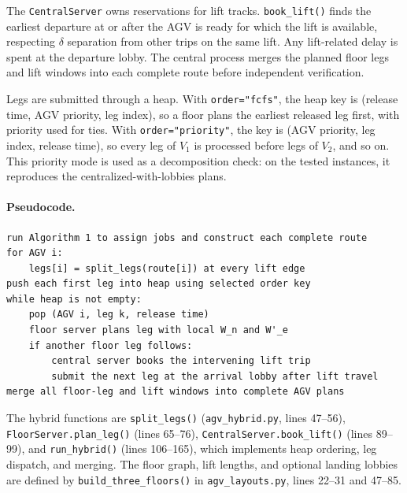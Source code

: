 \documentclass[11pt]{article}
\begin{document}
The \texttt{CentralServer} owns reservations for lift tracks.
\texttt{book\_lift()} finds the earliest departure at or after the AGV is
ready for which the lift is available, respecting $\delta$ separation from
other trips on the same lift. Any lift-related delay is spent at the
departure lobby. The central process merges the planned floor legs and lift
windows into each complete route before independent verification.

Legs are submitted through a heap. With \texttt{order="fcfs"}, the heap key is
(release time, AGV priority, leg index), so a floor plans the earliest
released leg first, with priority used for ties. With
\texttt{order="priority"}, the key is (AGV priority, leg index, release
time), so every leg of $V_1$ is processed before legs of $V_2$, and so on.
This priority mode is used as a decomposition check: on the tested instances,
it reproduces the centralized-with-lobbies plans.

\paragraph{Pseudocode.}
\begin{verbatim}
run Algorithm 1 to assign jobs and construct each complete route
for AGV i:
    legs[i] = split_legs(route[i]) at every lift edge
push each first leg into heap using selected order key
while heap is not empty:
    pop (AGV i, leg k, release time)
    floor server plans leg with local W_n and W'_e
    if another floor leg follows:
        central server books the intervening lift trip
        submit the next leg at the arrival lobby after lift travel
merge all floor-leg and lift windows into complete AGV plans
\end{verbatim}

The hybrid functions are \texttt{split\_legs()} (\texttt{agv\_hybrid.py},
lines 47--56), \texttt{FloorServer.plan\_leg()} (lines 65--76),
\texttt{CentralServer.book\_lift()} (lines 89--99), and
\texttt{run\_hybrid()} (lines 106--165), which implements heap ordering,
leg dispatch, and merging. The floor graph, lift lengths, and optional
landing lobbies are defined by \texttt{build\_three\_floors()} in
\texttt{agv\_layouts.py}, lines 22--31 and 47--85.
\end{document}
